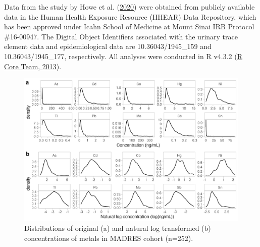 \documentclass[12pt, twoside]{amherstthesis}
\begin{document}
Data from the study by Howe et al. (\protect\hyperlink{ref-howe_prenatal_2020}{2020}) were obtained from publicly available data in the Human Health Exposure Resource (HHEAR) Data Repository, which has been approved under Icahn School of Medicine at Mount Sinai IRB Protocol \#16-00947. The Digital Object Identifiers associated with the urinary trace element data and epidemiological data are 10.36043/1945\_159 and 10.36043/1945\_177, respectively. All analyses were conducted in R v4.3.2 (\protect\hyperlink{ref-r_core_team_r_2013}{R Core Team, 2013}).
\begin{figure}

{\centering \includegraphics[width=0.9\linewidth]{figures/ch4_univlog} 

}

\caption{Distributions of original (a) and natural log transformed (b) concentrations of metals in MADRES cohort (n=252).}\label{fig:logtransf}
\end{figure}
\end{document}
